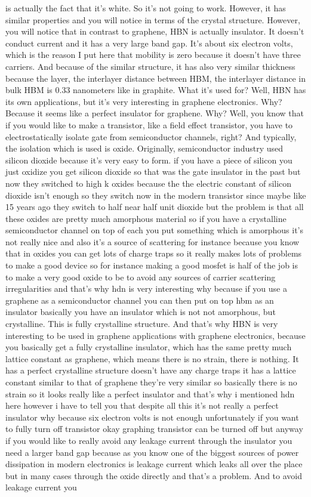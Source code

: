 is actually the fact that it's white. So it's not going to work. However, it has similar properties and you will notice in terms of the crystal structure. However, you will notice that in contrast to graphene, HBN is actually insulator. It doesn't conduct current and it has a very large band gap. It's about six electron volts, which is the reason I put here that mobility is zero because it doesn't have three carriers. And because of the similar structure, it has also very similar thickness because the layer, the interlayer distance between HBM, the interlayer distance in bulk HBM is 0.33 nanometers like in graphite. What it's used for? Well, HBN has its own applications, but it's very interesting in graphene electronics. Why? Because it seems like a perfect insulator for graphene. Why? Well, you know that if you would like to make a transistor, like a field effect transistor, you have to electrostatically isolate gate from semiconductor channels, right? And typically, the isolation which is used is oxide. Originally, semiconductor industry used silicon dioxide because it's very easy to form. if you have a piece of silicon you just oxidize you get silicon dioxide so that was the gate insulator in the past but now they switched to high k oxides because the the electric constant of silicon dioxide isn't enough so they switch now in the modern transistor since maybe like 15 years ago they switch to half near half unit dioxide but the problem is that all these oxides are pretty much amorphous material so if you have a crystalline semiconductor channel on top of each you put something which is amorphous it's not really nice and also it's a source of scattering for instance because you know that in oxides you can get lots of charge traps so it really makes lots of problems to make a good device so for instance making a good mosfet is half of the job is to make a very good oxide to be to avoid any sources of carrier scattering irregularities and that's why hdn is very interesting why because if you use a graphene as a semiconductor channel you can then put on top hbm as an insulator basically you have an insulator which is not not amorphous, but crystalline. This is fully crystalline structure. And that's why HBN is very interesting to be used in graphene applications with graphene electronics, because you basically get a fully crystalline insulator, which has the same pretty much lattice constant as graphene, which means there is no strain, there is nothing. It has a perfect crystalline structure doesn't have any charge traps it has a lattice constant similar to that of graphene they're very similar so basically there is no strain so it looks really like a perfect insulator and that's why i mentioned hdn here however i have to tell you that despite all this it's not really a perfect insulator why because six electron volts is not enough unfortunately if you want to fully turn off transistor okay graphing transistor can be turned off but anyway if you would like to really avoid any leakage current through the insulator you need a larger band gap because as you know one of the biggest sources of power dissipation in modern electronics is leakage current which leaks all over the place but in many cases through the oxide directly and that's a problem. And to avoid leakage current you 
